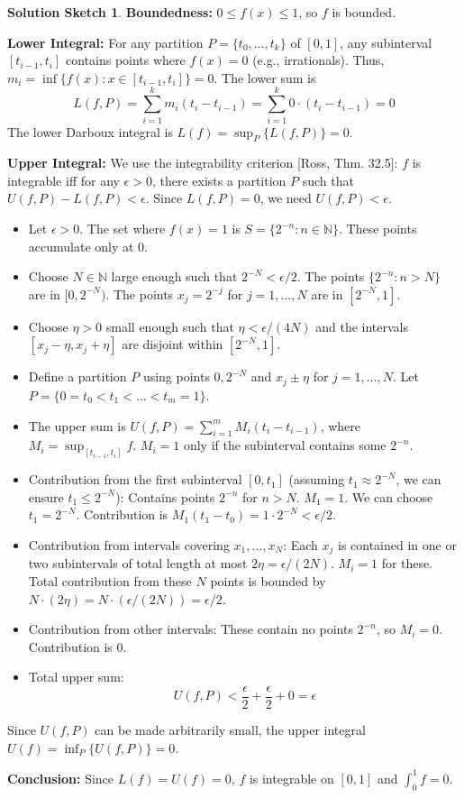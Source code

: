 \documentclass{article}
\newcommand{\N}{\mathbb{N}}
\theoremstyle{definition} %
\theoremstyle{definition} %
\newtheorem*{solution}{Solution Sketch}
\begin{document}
\begin{solution}
\textbf{Boundedness:} $0 \le f(x) \le 1$, so $f$ is bounded.

\textbf{Lower Integral:} For any partition $P=\{t_0, \dots, t_k\}$ of $[0,1]$, any subinterval $[t_{i-1}, t_i]$ contains points where $f(x)=0$ (e.g., irrationals). Thus, $m_i = \inf\{f(x) : x \in [t_{i-1}, t_i]\} = 0$. The lower sum is
\[
L(f,P) = \sum_{i=1}^k m_i (t_i - t_{i-1}) = \sum_{i=1}^k 0 \cdot (t_i - t_{i-1}) = 0
\]
The lower Darboux integral is $L(f) = \sup_P \{L(f,P)\} = 0$.

\textbf{Upper Integral:} We use the integrability criterion [Ross, Thm. 32.5]: $f$ is integrable iff for any $\epsilon > 0$, there exists a partition $P$ such that $U(f,P) - L(f,P) < \epsilon$. Since $L(f,P)=0$, we need $U(f,P) < \epsilon$.
\begin{itemize}
    \item Let $\epsilon > 0$. The set where $f(x)=1$ is $S=\{2^{-n} : n \in \N\}$. These points accumulate only at 0.
    \item Choose $N \in \N$ large enough such that $2^{-N} < \epsilon/2$. The points $\{2^{-n} : n > N\}$ are in $[0, 2^{-N})$. The points $x_j = 2^{-j}$ for $j=1, \dots, N$ are in $[2^{-N}, 1]$.
    \item Choose $\eta > 0$ small enough such that $\eta < \epsilon/(4N)$ and the intervals $[x_j-\eta, x_j+\eta]$ are disjoint within $[2^{-N}, 1]$.
    \item Define a partition $P$ using points $0, 2^{-N}$ and $x_j \pm \eta$ for $j=1,\dots,N$. Let $P = \{0=t_0 < t_1 < \dots < t_m=1\}$.
    \item The upper sum is $U(f,P) = \sum_{i=1}^m M_i (t_i - t_{i-1})$, where $M_i = \sup_{[t_{i-1}, t_i]} f$. $M_i=1$ only if the subinterval contains some $2^{-n}$.
    \item Contribution from the first subinterval $[0, t_1]$ (assuming $t_1 \approx 2^{-N}$, we can ensure $t_1 \le 2^{-N}$): Contains points $2^{-n}$ for $n>N$. $M_1=1$. We can choose $t_1 = 2^{-N}$. Contribution is $M_1(t_1-t_0) = 1 \cdot 2^{-N} < \epsilon/2$.
    \item Contribution from intervals covering $x_1, \dots, x_N$: Each $x_j$ is contained in one or two subintervals of total length at most $2\eta = \epsilon/(2N)$. $M_i=1$ for these. Total contribution from these $N$ points is bounded by $N \cdot (2\eta) = N \cdot (\epsilon/(2N)) = \epsilon/2$.
    \item Contribution from other intervals: These contain no points $2^{-n}$, so $M_i=0$. Contribution is 0.
    \item Total upper sum:
    \[
    U(f,P) < \frac{\epsilon}{2} + \frac{\epsilon}{2} + 0 = \epsilon
    \]
\end{itemize}
Since $U(f,P)$ can be made arbitrarily small, the upper integral $U(f) = \inf_P \{U(f,P)\} = 0$.

\textbf{Conclusion:} Since $L(f)=U(f)=0$, $f$ is integrable on $[0,1]$ and $\int_0^1 f = 0$.
\end{solution}
\end{document}
